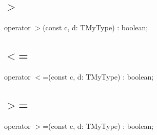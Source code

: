 \documentclass{report}
\begin{document}
\subsection*{{$>$}}
\begin{list}{}{
\setlength{\itemindent}{0cm}
\setlength{\listparindent}{0cm}
\setlength{\leftmargin}{\evensidemargin}
\addtolength{\leftmargin}{\tmplength}
\settowidth{\labelsep}{X}
\addtolength{\leftmargin}{\labelsep}
\setlength{\labelwidth}{\tmplength}
}
\begin{flushleft}
\item[\textbf{Declaration}\hfill]
\begin{ttfamily}
operator {$>$}(const c, d: TMyType) : boolean;\end{ttfamily}


\end{flushleft}
\end{list}
\subsection*{{$<$}=}
\begin{list}{}{
\setlength{\itemindent}{0cm}
\setlength{\listparindent}{0cm}
\setlength{\leftmargin}{\evensidemargin}
\addtolength{\leftmargin}{\tmplength}
\settowidth{\labelsep}{X}
\addtolength{\leftmargin}{\labelsep}
\setlength{\labelwidth}{\tmplength}
}
\begin{flushleft}
\item[\textbf{Declaration}\hfill]
\begin{ttfamily}
operator {$<$}=(const c, d: TMyType) : boolean;\end{ttfamily}


\end{flushleft}
\end{list}
\subsection*{{$>$}=}
\begin{list}{}{
\setlength{\itemindent}{0cm}
\setlength{\listparindent}{0cm}
\setlength{\leftmargin}{\evensidemargin}
\addtolength{\leftmargin}{\tmplength}
\settowidth{\labelsep}{X}
\addtolength{\leftmargin}{\labelsep}
\setlength{\labelwidth}{\tmplength}
}
\begin{flushleft}
\item[\textbf{Declaration}\hfill]
\begin{ttfamily}
operator {$>$}=(const c, d: TMyType) : boolean;\end{ttfamily}


\end{flushleft}
\end{list}
\end{document}
